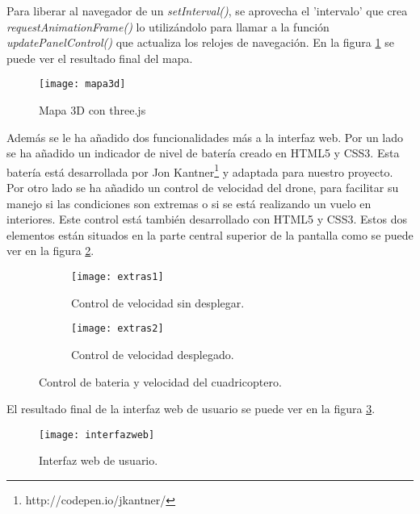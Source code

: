 Para liberar al navegador de un \emph{setInterval()}, se aprovecha el 'intervalo' que crea \emph{requestAnimationFrame()} lo utilizándolo para llamar a la función \emph{updatePanelControl()} que actualiza los relojes de navegación. En la figura \ref{fig:mapa3d} se puede ver el resultado final del mapa.\\

\begin{figure}[h!]
\centering
\texttt{[image: mapa3d]}
\caption{Mapa 3D con three.js}
\label{fig:mapa3d}
\end{figure}


Además se le ha añadido dos funcionalidades más a la interfaz web. Por un lado se ha añadido un indicador de nivel de batería creado en HTML5 y CSS3. Esta batería está desarrollada por Jon Kantner\footnote{http://codepen.io/jkantner/}\cite{bateria} y adaptada para nuestro proyecto. Por otro lado se ha añadido un control de velocidad del drone, para facilitar su manejo si las condiciones son extremas o si se está realizando un vuelo en interiores. Este control está también desarrollado con HTML5 y CSS3. Estos dos elementos están situados en la parte central superior de la pantalla como se puede ver en la figura \ref{fig:bateriayvelocidad}.\\

\begin{figure}[h!]
\centering
  \begin{subfigure}[]{60mm}
    \texttt{[image: extras1]}
    \caption{Control de velocidad sin desplegar.} 
  \end{subfigure}
  \hspace{5pt}
  \begin{subfigure}[]{60mm}
    \texttt{[image: extras2]}
    \caption{Control de velocidad desplegado.}
  \end{subfigure}
  \caption{Control de bateria y velocidad del cuadricoptero.}\label{fig:bateriayvelocidad}
\end{figure}


El resultado final de la interfaz web de usuario se puede ver en la figura \ref{fig:interfazweb}.


\begin{figure}[h!]
\centering
\texttt{[image: interfazweb]}
\caption{Interfaz web de usuario.}
\label{fig:interfazweb}
\end{figure}
